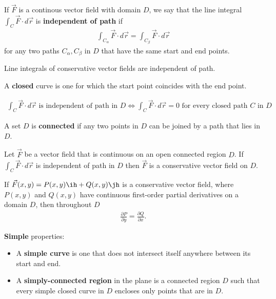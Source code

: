 \documentclass{article}
\begin{document}
\begin{definition}
	If $\vec F$ is a continous vector field with domain $D$, we say that the
	line integral $\int_C\vec F\cdot d\vec r$ is
	\textbf{independent of path} if
	\begin{align*}
		\int_{C_\alpha} \vec F\cdot d\vec r = \int_{C_\beta}\vec F\cdot d\vec r
	\end{align*}
	for any two paths $C_\alpha, C_\beta$ in $D$ that have the same start and
	end points.
\end{definition}
\begin{theorem}
	Line integrals of conservative vector fields are independent of path.
\end{theorem}
\begin{definition}
	A \textbf{closed} curve is one for which the start point coincides with the end point.
\end{definition}
\begin{theorem}
	\begin{align*}
		\int_C \vec F\cdot d\vec r \text{ is independent of path in $D$}
		\Leftrightarrow
		\int_C \vec F\cdot d\vec r = 0 \text{ for every closed path $C$ in $D$}
	\end{align*}
\end{theorem}
\begin{definition}
	A set $D$ is \textbf{connected} if any two points in $D$ can be joined by a
	path that lies in $D$.
\end{definition}
\begin{theorem}
	Let $\vec F$ be a vector field that is continuous on an open connected
	region $D$. If $\int_C\vec F\cdot d\vec r$ is independent of path in $D$
	then $\vec F$ is a conservative vector field on $D$.
\end{theorem}
\begin{theorem}
	If $\vec F(x,y) = P(x,y)\ih + Q(x,y)\jh$ is a conservative vector field,
	where $P(x,y)$ and $Q(x,y)$ have continuous first-order partial derivatives
	on a domain $D$, then throughout $D$
	\begin{align*}
		\frac{\partial P}{\partial y}=\frac{\partial Q}{\partial x}.
	\end{align*}
\end{theorem}
\begin{definition}
	\textbf{Simple} properties:
	\begin{itemize}
		\item A \textbf{simple curve} is one that does not intersect itself anywhere
		      between its start and end.
		\item A \textbf{simply-connected region} in the plane is a connected region $D$
		      such that every simple closed curve in $D$ encloses only points that
		      are in $D$.
	\end{itemize}
\end{definition}
\end{document}
